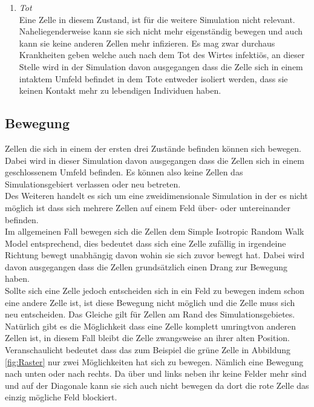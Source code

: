 \begin{enumerate}
\item{\emph{Tot}\\
Eine Zelle in diesem Zustand, ist für die weitere Simulation nicht relevant. Naheliegenderweise kann sie sich nicht mehr eigenständig bewegen und auch kann sie keine anderen Zellen mehr infizieren. Es mag zwar durchaus Krankheiten geben welche auch nach dem Tot des Wirtes infektiös, an dieser Stelle wird in der Simulation davon ausgegangen dass die Zelle sich in einem intaktem Umfeld befindet in dem Tote entweder isoliert werden, dass sie keinen Kontakt mehr zu lebendigen Individuen haben. 
}
\end{enumerate}

\subsection*{Bewegung}
Zellen die sich in einem der ersten drei Zustände befinden können sich bewegen. Dabei wird in dieser Simulation davon ausgegangen dass die Zellen sich in einem geschlossenem Umfeld befinden. Es können also keine Zellen das Simulationsgebiert verlassen oder neu betreten.\\
Des Weiteren handelt es sich um eine zweidimensionale Simulation in der es nicht möglich ist dass sich mehrere Zellen auf einem Feld über- oder untereinander befinden.\\
Im allgemeinen Fall bewegen sich die Zellen dem Simple Isotropic  Random Walk Model \cite{Codling:2008} entsprechend, dies bedeutet dass sich eine Zelle zufällig in irgendeine Richtung bewegt unabhängig davon wohin sie sich zuvor bewegt hat. Dabei wird davon ausgegangen dass die Zellen grundsätzlich einen Drang zur Bewegung haben.\\
Sollte sich eine Zelle jedoch entscheiden sich in ein Feld zu bewegen indem schon eine andere Zelle ist, ist diese Bewegung nicht möglich und die Zelle muss sich neu entscheiden. Das Gleiche gilt für Zellen am Rand des Simulationsgebietes. Natürlich gibt es die Möglichkeit dass eine Zelle komplett \glqq umringt\grqq von anderen Zellen ist, in diesem Fall bleibt die Zelle zwangsweise an ihrer alten Position.\\
Veranschaulicht bedeutet dass das zum Beispiel die grüne Zelle in Abbildung \ref{fig:Raster} nur zwei Möglichkeiten hat sich zu bewegen. Nämlich eine Bewegung nach unten oder nach rechts. Da über und links neben ihr keine Felder mehr sind und auf der Diagonale kann sie sich auch nicht bewegen da dort die rote Zelle das einzig mögliche Feld blockiert.\\
